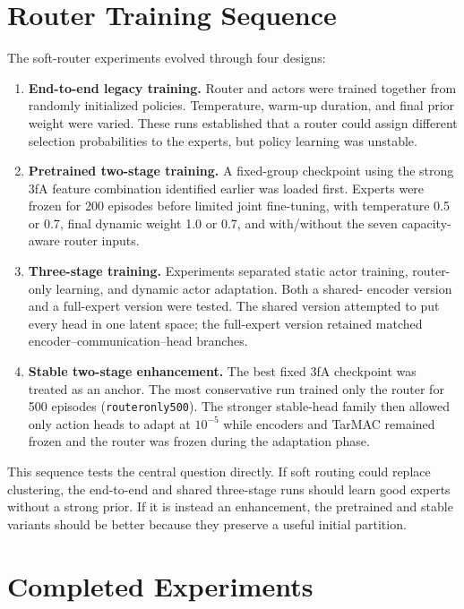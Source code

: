 \section{Router Training Sequence}

The soft-router experiments evolved through four designs:
\begin{enumerate}
  \item \textbf{End-to-end legacy training.} Router and actors were trained
  together from randomly initialized policies. Temperature, warm-up duration,
  and final prior weight were varied. These runs established that a router could
  assign different selection probabilities to the experts, but policy learning
  was unstable.
  \item \textbf{Pretrained two-stage training.} A fixed-group checkpoint using
  the strong 3fA feature combination identified earlier was loaded first.
  Experts were frozen for 200 episodes before
  limited joint fine-tuning, with temperature 0.5 or 0.7, final dynamic weight
  1.0 or 0.7, and with/without the seven capacity-aware router inputs.
  \item \textbf{Three-stage training.} Experiments separated static actor
  training, router-only learning, and dynamic actor adaptation. Both a shared-
  encoder version and a full-expert version were tested. The shared version
  attempted to put every head in one latent space; the full-expert version
  retained matched encoder--communication--head branches.
  \item \textbf{Stable two-stage enhancement.} The best fixed 3fA checkpoint
  was treated as an anchor. The most conservative run trained only the router
  for 500 episodes (\texttt{routeronly500}). The stronger stable-head family
  then allowed only action heads to adapt at $10^{-5}$ while encoders and TarMAC
  remained frozen and the router was frozen during the adaptation phase.
\end{enumerate}

This sequence tests the central question directly. If soft routing could replace
clustering, the end-to-end and shared three-stage runs should learn good experts
without a strong prior. If it is instead an enhancement, the pretrained and
stable variants should be better because they preserve a useful initial
partition.


\section{Completed Experiments}

